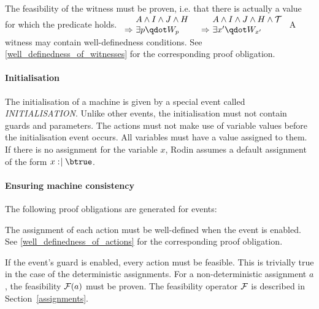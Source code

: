 The feasibility of the witness must be proven, i.e. that there is actually a value for which the predicate holds.
%
  {$\begin{array}{r@{\ }l}
      & A \land I \land J \land H \\
      \limp & \exists p \qdot W_p
    \end{array}$}
%
  {$\begin{array}{r@{\ }l}
      & A \land I \land J \land H \land \concbeforeafter \\
      \limp & \exists x' \qdot W_{x'}
    \end{array}$}
A witness may contain well-definedness conditions. See \ref{well_definedness_of_witnesses}
  for the corresponding proof obligation.

\paragraph{Initialisation}
\label{initialization}
The initialisation of a machine is given by a special event called \textsl{INITIALISATION}.
Unlike other events, the initialisation must not contain guards and parameters.
The actions must not make use of variable values before the initialisation event occurs.
All variables must have a value assigned to them. If there is no assignment for the variable $x$, Rodin assumes a default assignment of the form $x\bcmsuch \btrue$.

\paragraph{Ensuring machine consistency}
\label{consistency_proof_obligations}
The following proof obligations are generated for events:

The assignment of each action must be well-defined when the event is enabled. See
  \ref{well_definedness_of_actions} for the corresponding proof obligation.
  
If the event's guard is enabled, every action must be feasible.
  This is trivially true in the case of the deterministic assignments.
  For a non-deterministic assignment $a$, the feasibility $\mathcal{F}(a)$ must be proven.
  The feasibility operator $\mathcal{F}$ is described in Section~\ref{assignments}.
  
